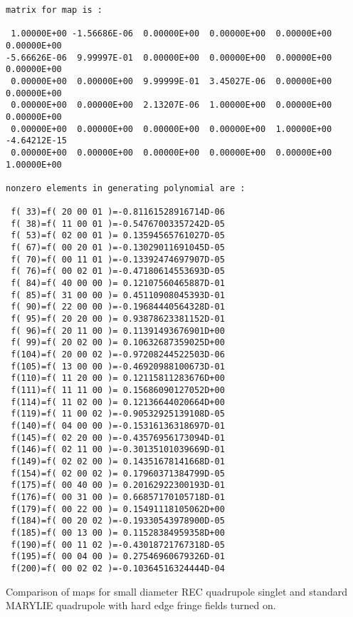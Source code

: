 \begin{footnotesize}
\begin{verbatim}
matrix for map is :

 1.00000E+00 -1.56686E-06  0.00000E+00  0.00000E+00  0.00000E+00  0.00000E+00
-5.66626E-06  9.99997E-01  0.00000E+00  0.00000E+00  0.00000E+00  0.00000E+00
 0.00000E+00  0.00000E+00  9.99999E-01  3.45027E-06  0.00000E+00  0.00000E+00
 0.00000E+00  0.00000E+00  2.13207E-06  1.00000E+00  0.00000E+00  0.00000E+00
 0.00000E+00  0.00000E+00  0.00000E+00  0.00000E+00  1.00000E+00 -4.64212E-15
 0.00000E+00  0.00000E+00  0.00000E+00  0.00000E+00  0.00000E+00  1.00000E+00

nonzero elements in generating polynomial are :

 f( 33)=f( 20 00 01 )=-0.81161528916714D-06
 f( 38)=f( 11 00 01 )=-0.54767003357242D-05
 f( 53)=f( 02 00 01 )= 0.13594565761027D-05
 f( 67)=f( 00 20 01 )=-0.13029011691045D-05
 f( 70)=f( 00 11 01 )=-0.13392474697907D-05
 f( 76)=f( 00 02 01 )=-0.47180614553693D-05
 f( 84)=f( 40 00 00 )= 0.12107560465887D-01
 f( 85)=f( 31 00 00 )= 0.45110908045393D-01
 f( 90)=f( 22 00 00 )=-0.19684440564328D-01
 f( 95)=f( 20 20 00 )= 0.93878623381152D-01
 f( 96)=f( 20 11 00 )= 0.11391493676901D+00
 f( 99)=f( 20 02 00 )= 0.10632687359025D+00
 f(104)=f( 20 00 02 )=-0.97208244522503D-06
 f(105)=f( 13 00 00 )=-0.46920988100673D-01
 f(110)=f( 11 20 00 )= 0.12115811283676D+00
 f(111)=f( 11 11 00 )= 0.15686090127052D+00
 f(114)=f( 11 02 00 )= 0.12136644020664D+00
 f(119)=f( 11 00 02 )=-0.90532925139108D-05
 f(140)=f( 04 00 00 )=-0.15316136318697D-01
 f(145)=f( 02 20 00 )=-0.43576956173094D-01
 f(146)=f( 02 11 00 )=-0.30135101039669D-01
 f(149)=f( 02 02 00 )= 0.14351678141668D-01
 f(154)=f( 02 00 02 )= 0.17960371384799D-05
 f(175)=f( 00 40 00 )= 0.20162922300193D-01
 f(176)=f( 00 31 00 )= 0.66857170105718D-01
 f(179)=f( 00 22 00 )= 0.15491118105062D+00
 f(184)=f( 00 20 02 )=-0.19330543978900D-05
 f(185)=f( 00 13 00 )= 0.11528384959358D+00
 f(190)=f( 00 11 02 )=-0.43018721767318D-05
 f(195)=f( 00 04 00 )= 0.27546960679326D-01
 f(200)=f( 00 02 02 )=-0.10364516324444D-04
\end{verbatim}
\end{footnotesize}
Comparison of maps for small diameter REC quadrupole singlet
and standard MARYLIE quadrupole with hard edge fringe fields
turned on.
